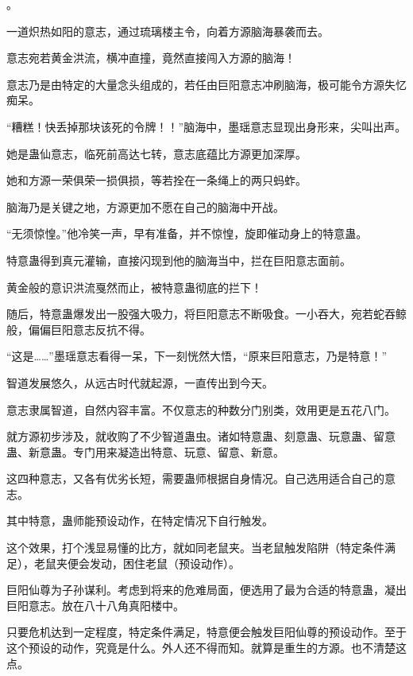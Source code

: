 
\begin{this_body}

。

一道炽热如阳的意志，通过琉璃楼主令，向着方源脑海暴袭而去。

意志宛若黄金洪流，横冲直撞，竟然直接闯入方源的脑海！

意志乃是由特定的大量念头组成的，若任由巨阳意志冲刷脑海，极可能令方源失忆痴呆。

“糟糕！快丢掉那块该死的令牌！！”脑海中，墨瑶意志显现出身形来，尖叫出声。

她是蛊仙意志，临死前高达七转，意志底蕴比方源更加深厚。

她和方源一荣俱荣一损俱损，等若拴在一条绳上的两只蚂蚱。

脑海乃是关键之地，方源更加不愿在自己的脑海中开战。

“无须惊惶。”他冷笑一声，早有准备，并不惊惶，旋即催动身上的特意蛊。

特意蛊得到真元灌输，直接闪现到他的脑海当中，拦在巨阳意志面前。

黄金般的意识洪流戛然而止，被特意蛊彻底的拦下！

随后，特意蛊爆发出一股强大吸力，将巨阳意志不断吸食。一小吞大，宛若蛇吞鲸般，偏偏巨阳意志反抗不得。

“这是……”墨瑶意志看得一呆，下一刻恍然大悟，“原来巨阳意志，乃是特意！”

智道发展悠久，从远古时代就起源，一直传出到今天。

意志隶属智道，自然内容丰富。不仅意志的种数分门别类，效用更是五花八门。

就方源初步涉及，就收购了不少智道蛊虫。诸如特意蛊、刻意蛊、玩意蛊、留意蛊、新意蛊。专门用来凝造出特意、玩意、留意、新意。

这四种意志，又各有优劣长短，需要蛊师根据自身情况。自己选用适合自己的意志。

其中特意，蛊师能预设动作，在特定情况下自行触发。

这个效果，打个浅显易懂的比方，就如同老鼠夹。当老鼠触发陷阱（特定条件满足），老鼠夹便会发动，困住老鼠（预设动作）。

巨阳仙尊为子孙谋利。考虑到将来的危难局面，便选用了最为合适的特意蛊，凝出巨阳意志。放在八十八角真阳楼中。

只要危机达到一定程度，特定条件满足，特意便会触发巨阳仙尊的预设动作。至于这个预设的动作，究竟是什么。外人还不得而知。就算是重生的方源。也不清楚这点。


\end{this_body}
